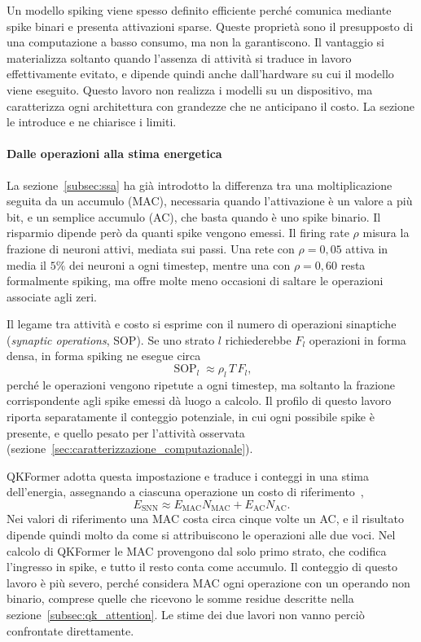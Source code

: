 Un modello spiking viene spesso definito efficiente perché comunica mediante spike binari e presenta attivazioni sparse. Queste proprietà sono il presupposto di una computazione a basso consumo, ma non la garantiscono. Il vantaggio si materializza soltanto quando l'assenza di attività si traduce in lavoro effettivamente evitato, e dipende quindi anche dall'hardware su cui il modello viene eseguito. Questo lavoro non realizza i modelli su un dispositivo, ma caratterizza ogni architettura con grandezze che ne anticipano il costo. La sezione le introduce e ne chiarisce i limiti.

\paragraph{Dalle operazioni alla stima energetica}
\label{subsec:operazioni_energia}

La sezione~\ref{subsec:ssa} ha già introdotto la differenza tra una moltiplicazione seguita da un accumulo (MAC), necessaria quando l'attivazione è un valore a più bit, e un semplice accumulo (AC), che basta quando è uno spike binario. Il risparmio dipende però da quanti spike vengono emessi. Il firing rate $\rho$ misura la frazione di neuroni attivi, mediata sui passi. Una rete con $\rho=0{,}05$ attiva in media il $5\%$ dei neuroni a ogni timestep, mentre una con $\rho=0{,}60$ resta formalmente spiking, ma offre molte meno occasioni di saltare le operazioni associate agli zeri.

Il legame tra attività e costo si esprime con il numero di operazioni sinaptiche (\emph{synaptic operations}, SOP). Se uno strato $l$ richiederebbe $F_l$ operazioni in forma densa, in forma spiking ne esegue circa
\begin{equation}
\label{eq:stima_sop}
\operatorname{SOP}_l \approx \rho_l \, T \, F_l,
\end{equation}
perché le operazioni vengono ripetute a ogni timestep, ma soltanto la frazione corrispondente agli spike emessi dà luogo a calcolo. Il profilo di questo lavoro riporta separatamente il conteggio potenziale, in cui ogni possibile spike è presente, e quello pesato per l'attività osservata (sezione~\ref{sec:caratterizzazione_computazionale}).

QKFormer adotta questa impostazione e traduce i conteggi in una stima dell'energia, assegnando a ciascuna operazione un costo di riferimento~\cite{zhou2024qkformer},
\begin{equation}
\label{eq:energia_snn_semplificata}
E_{\mathrm{SNN}} \approx E_{\mathrm{MAC}}N_{\mathrm{MAC}} + E_{\mathrm{AC}}N_{\mathrm{AC}}.
\end{equation}
Nei valori di riferimento una MAC costa circa cinque volte un AC, e il risultato dipende quindi molto da come si attribuiscono le operazioni alle due voci. Nel calcolo di QKFormer le MAC provengono dal solo primo strato, che codifica l'ingresso in spike, e tutto il resto conta come accumulo. Il conteggio di questo lavoro è più severo, perché considera MAC ogni operazione con un operando non binario, comprese quelle che ricevono le somme residue descritte nella sezione~\ref{subsec:qk_attention}. Le stime dei due lavori non vanno perciò confrontate direttamente.


